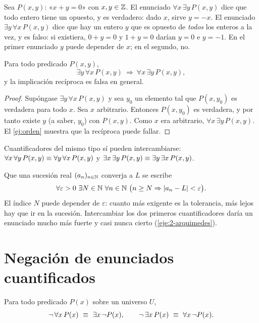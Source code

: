\begin{ejemplo}\label{ej:orden}
Sea $P(x,y)$: «$x+y=0$» con $x,y\in\mathbb{Z}$. El enunciado $\forall x\,\exists y\,P(x,y)$ dice que todo entero tiene un opuesto, y es verdadero: dado $x$, sirve $y=-x$. El enunciado $\exists y\,\forall x\,P(x,y)$ dice que hay un entero $y$ que es opuesto de \emph{todos} los enteros a la vez, y es falso: si existiera, $0+y=0$ y $1+y=0$ darían $y=0$ e $y=-1$. En el primer enunciado $y$ puede depender de $x$; en el segundo, no.
\end{ejemplo}

\begin{proposicion}\label{prop:orden}
Para todo predicado $P(x,y)$,
\[
\exists y\,\forall x\,P(x,y)\ \Longrightarrow\ \forall x\,\exists y\,P(x,y),
\]
y la implicación recíproca es falsa en general.
\end{proposicion}

\begin{proof}
Supóngase $\exists y\,\forall x\,P(x,y)$ y sea $y_0$ un elemento tal que $P(x,y_0)$ es verdadera para todo $x$. Sea $x$ arbitrario. Entonces $P(x,y_0)$ es verdadera, y por tanto existe $y$ (a saber, $y_0$) con $P(x,y)$. Como $x$ era arbitrario, $\forall x\,\exists y\,P(x,y)$. El \cref{ej:orden} muestra que la recíproca puede fallar.
\end{proof}

Cuantificadores del mismo tipo sí pueden intercambiarse: $\forall x\,\forall y\,P(x,y)\equiv\forall y\,\forall x\,P(x,y)$ y $\exists x\,\exists y\,P(x,y)\equiv\exists y\,\exists x\,P(x,y)$.

\begin{ejemplo}\label{ej:limite}
Que una sucesión real $(a_n)_{n\in\mathbb{N}}$ converja a $L$ se escribe
\[
\forall\varepsilon>0\ \exists N\in\mathbb{N}\ \forall n\in\mathbb{N}\ \bigl(n\ge N\Rightarrow\lvert a_n-L\rvert<\varepsilon\bigr).
\]
El índice $N$ puede depender de $\varepsilon$: cuanto más exigente es la tolerancia, más lejos hay que ir en la sucesión. Intercambiar los dos primeros cuantificadores daría un enunciado mucho más fuerte y casi nunca cierto (\cref{eje:2-arquimedes}).
\end{ejemplo}

\section{Negación de enunciados cuantificados}

\begin{teorema}\label{teo:negacion}
Para todo predicado $P(x)$ sobre un universo $U$,
\[
\neg\,\forall x\,P(x)\ \equiv\ \exists x\,\neg P(x),\qquad
\neg\,\exists x\,P(x)\ \equiv\ \forall x\,\neg P(x).
\]
\end{teorema}

